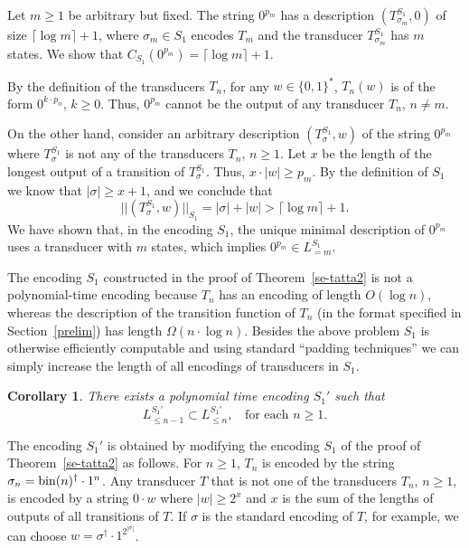 \documentclass[copyright]{eptcs}
\def \prend{\vrule depth-1pt height7pt width6pt}
\def \proof{\bigbreak\noindent{\bf Proof.\ \ }}
\def \endpf{{\ \ \prend \medbreak}}
\newtheorem{corollary}{Corollary}[section]
\begin{document}
Let $m \geq 1$ be arbitrary but fixed. The string $0^{p_m}$ has a description
$(T^{S_1}_{\sigma_m}, 0)$ of size $\lceil \log m \rceil + 1$,
where $\sigma_m \in S_1$ encodes $T_m$ and
the transducer $T^{S_1}_{\sigma_m}$ has $m$ states.
We show that $C_{S_1}(0^{p_m}) = \lceil \log m \rceil + 1$.

By the definition of the transducers $T_n$, for any $w \in \{ 0, 1 \}^*$,
$T_n(w)$ is of the form $0^{k \cdot p_n}$, $k \geq 0$. Thus,
$0^{p_m}$ cannot be the output of any transducer $T_n$, $n \neq m$.

On the other hand, consider an
arbitrary description $(T^{S_1}_\sigma, w)$
of the string $0^{p_m}$ where $T^{S_1}_\sigma$ is not any
of the transducers $T_n$, $n \geq 1$. Let $x$ be the length
of the longest output of a transition of $T^{S_1}_\sigma$.
Thus, $x \cdot |w| \geq p_m$. By the definition of $S_1$ we
know that $|\sigma| \geq x + 1$, and we conclude that
$$
|| (T^{S_1}_\sigma, w) ||_{S_1} = |\sigma| + |w| > \lceil \log m \rceil + 1.
$$
We have shown that, in the encoding $S_1$,
the unique minimal description
of $0^{p_m}$ uses a transducer with $m$ states, which
implies $0^{p_m} \in L^{S_1}_{ =m}$.
\endpf

The encoding $S_1$ constructed in the proof of Theorem~\ref{se-tatta2}
is not a polynomial-time encoding because $T_n$ has an encoding
of length $O(\log n)$, whereas the description of the transition
function of $T_n$ (in the format specified in Section~\ref{prelim})
has length $\Omega(n \cdot \log n)$. Besides  the above
problem $S_1$ is otherwise efficiently computable and using  standard
``padding techniques'' we can simply increase the length of all
encodings of transducers in $S_1$.

\begin{corollary}
\label{se-tatta3}
There exists a polynomial time encoding
$S_{1}'$
such that
$$
L^{S_{1}'}_{ \leq n-1} \subset L^{S_{1}'}_{ \leq n}, \;\; \mbox{ for each }
n \geq 1.
$$
\end{corollary}

\proof
The encoding $S_1'$ is obtained by modifying the encoding $S_1$ of
the proof of Theorem~\ref{se-tatta2} as follows. For $n \geq 1$,
$T_n$ is encoded by the string $\sigma_n =
{\rm bin}(n)^{\dagger} \cdot 1^n$.
Any transducer $T$ that is not one of the transducers $T_n$, $n \geq 1$,
is encoded by a string $0 \cdot w$ where $|w| \geq 2^x$ and $x$
is the sum of the lengths of outputs of all transitions of $T$. If
$\sigma$ is the standard encoding of $T$, for example, we can choose
$w = \sigma^{\dagger} \cdot 1^{2^{|\sigma|}}$.
\end{document}
